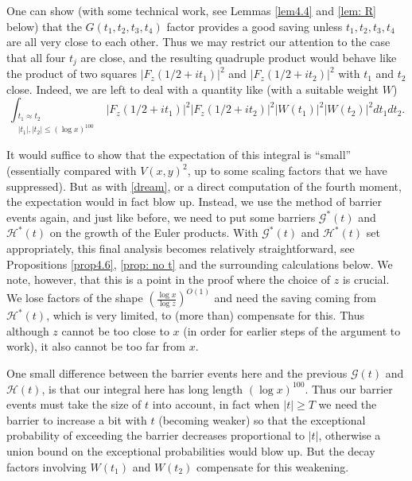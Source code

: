 \documentclass[12pt, notitlepage]{amsart}
\numberwithin{equation}{section}
\theoremstyle{remark}
\theoremstyle{definition}
\theoremstyle{remark}
\numberwithin{equation}{section}
\begin{document}
One can show (with some technical work, see Lemmas \ref{lem4.4} and \ref{lem: R} below) that the $G(t_1, t_2, t_3, t_4)$ factor
provides a good saving unless $t_1, t_2, t_3, t_4$ are all very close to each other. Thus we may restrict our attention to the case that all four $t_j$ are close, and the resulting quadruple product would behave like the product of two squares $|F_z(1/2+it_1)|^{2}$ and  $|F_z(1/2+it_2)|^{2}$ with $t_1$ and $t_2$ close. Indeed, we are left to deal with a quantity like 
(with a suitable weight $W$)  
\[
\int_{\substack{t_1\approx t_2 \\ |t_1|, |t_2|\le (\log x)^{100}}} |F_z(1/2+it_1)|^{2}|F_z(1/2+it_2)|^{2}  |W(t_1)|^2 |W(t_2)|^2 dt_1 dt_2.
 \]

It would suffice to show that the expectation of this integral is ``small'' (essentially compared with $V(x,y)^2$, up to some scaling factors that we have suppressed). But as with \eqref{dream}, or a direct computation of the fourth moment, the expectation would in fact blow up. Instead, we use the method of barrier events again, and just like before, we need to put some barriers $\mathcal{G}^{*}(t)$ and $\mathcal
{H}^{*}(t)$ on the growth of the Euler products. With $\mathcal{G}^{*}(t)$ and $\mathcal
{H}^{*}(t)$ set appropriately, this final analysis becomes relatively straightforward, see Propositions \ref{prop4.6}, \ref{prop: no t} and the surrounding calculations below. We note, however, that this is a point in the proof where the choice of $z$ is crucial. We lose factors of the shape $(\frac{\log x}{\log z})^{O(1)}$ and need the saving coming from $\mathcal{H}^{*}(t)$, which is very limited, to (more than) compensate for this. Thus although $z$ cannot be too close to $x$ (in order for earlier steps of the argument to work), it also cannot be too far from $x$.

One small difference between the barrier events here and the previous $\mathcal{G}(t)$ and $\mathcal{H}(t)$, is that our integral here has long length $(\log x)^{100}$. Thus our barrier events must take the size of $t$ into account, in fact when $|t| \geq T$ we need the barrier to increase a bit with $t$ (becoming weaker) so that the exceptional probability of exceeding the barrier decreases proportional to $|t|$, otherwise a union bound on the exceptional probabilities would blow up. But the decay factors involving $W(t_1)$ and $W(t_2)$ compensate for this weakening.
\end{document}
